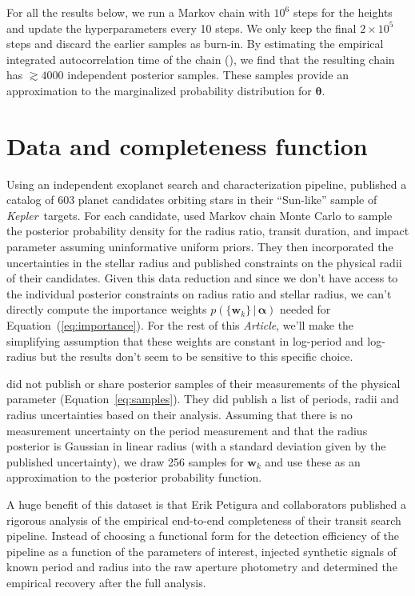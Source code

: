 \documentclass[12pt,preprint]{aastex}
\newcommand{\project}[1]{\emph{#1}}
\newcommand{\kepler}{\project{Kepler}}
\newcommand{\paper}{\textsl{Article}}
\newcommand{\Eq}[1]{Equation~(\ref{eq:#1})}
\newcommand{\eq}[1]{\Eq{#1}}
\newcommand{\eqalt}[1]{Equation~\ref{eq:#1}}
\newcommand{\sectlabel}[1]{\label{sect:#1}}
\newcommand{\bvec}[1]{\ensuremath{\boldsymbol{#1}}}
\newcommand{\ratepar}{{\ensuremath{\theta}}}
\newcommand{\ratepars}{{\ensuremath{\bvec{\ratepar}}}}
\newcommand{\entry}{{\ensuremath{\bvec{w}}}}
\newcommand{\interim}{{\ensuremath{\bvec{\alpha}}}}
\begin{document}
For all the results below, we run a Markov chain with $10^6$ steps for the
heights and update the hyperparameters every 10 steps.
We only keep the final $2 \times 10^5$ steps and discard the earlier samples
as burn-in.
By estimating the empirical integrated autocorrelation time of the chain
(\citealt{goodman}), we find that the resulting chain has $\gtrsim4000$
independent posterior samples.
These samples provide an approximation to the marginalized probability
distribution for \ratepars.

\section{Data and completeness function}
\sectlabel{data}

Using an independent exoplanet search and characterization pipeline,
\citet{petigura} published a catalog of 603 planet candidates orbiting stars
in their ``Sun-like'' sample of \kepler\ targets.
For each candidate, \citet{petigura} used Markov chain Monte Carlo to sample
the posterior probability density for the radius ratio, transit duration, and
impact parameter assuming uninformative uniform priors.
They then incorporated the uncertainties in the stellar radius and published
constraints on the physical radii of their candidates.
Given this data reduction and since we don't have access to the individual
posterior constraints on radius ratio and stellar radius, we can't directly
compute the importance weights $p(\{\entry_k\}\,|\,\interim)$ needed for
\eq{importance}.
For the rest of this \paper, we'll make the simplifying assumption that these
weights are constant in log-period and log-radius but the results don't seem
to be sensitive to this specific choice.

\citet{petigura} did not publish or share posterior samples of their
measurements of the physical parameter (\eqalt{samples}).
They did publish a list of periods, radii and radius uncertainties based on
their analysis.
Assuming that there is no measurement uncertainty on the period measurement
and that the radius posterior is Gaussian in linear radius (with a standard
deviation given by the published uncertainty), we draw 256 samples for
$\entry_k$ and use these as an approximation to the posterior probability
function.

A huge benefit of this dataset is that Erik Petigura and collaborators
published a rigorous analysis of the empirical end-to-end completeness of
their transit search pipeline.
Instead of choosing a functional form for the detection efficiency of the
pipeline as a function of the parameters of interest, \citet{petigura}
injected synthetic signals of known period and radius into the raw aperture
photometry and determined the empirical recovery after the full analysis.
\end{document}
